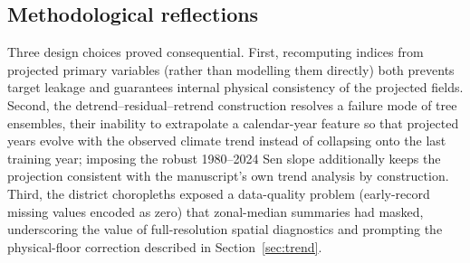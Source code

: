 \documentclass[review,11pt]{elsarticle}
\begin{document}
\subsection{Methodological reflections}
Three design choices proved consequential. First, recomputing indices from
projected primary variables (rather than modelling them directly) both prevents
target leakage and guarantees internal physical consistency of the projected
fields. Second, the detrend--residual--retrend construction resolves a failure
mode of tree ensembles, their inability to extrapolate a calendar-year
feature so that projected years evolve with the observed climate trend instead
of collapsing onto the last training year; imposing the robust 1980--2024 Sen
slope additionally keeps the projection consistent with the manuscript's own
trend analysis by construction. Third, the district choropleths exposed a
data-quality problem (early-record missing values encoded as zero) that
zonal-median summaries had masked, underscoring the value of full-resolution
spatial diagnostics and prompting the physical-floor correction described in
Section~\ref{sec:trend}.
\end{document}
